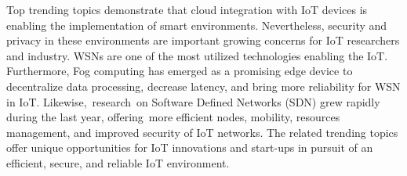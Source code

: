 \documentclass[symmetry,article,accept,moreauthors,pdftex10pt,a4paper]{mdpi}
\begin{document}
Top trending topics demonstrate that cloud integration with IoT devices is enabling the implementation of smart environments. Nevertheless, security and privacy in these environments are important growing concerns for IoT researchers and industry. WSNs are one of the most utilized technologies enabling the IoT. Furthermore, Fog computing has emerged as a promising edge device to decentralize data processing, decrease latency, and bring more reliability for WSN in IoT. Likewise,~research~on Software Defined Networks (SDN) grew rapidly during the last year, offering~more efficient nodes, mobility, resources management, and improved security of IoT networks. The related trending topics offer unique opportunities for IoT innovations and start-ups in pursuit of an efficient, secure, and reliable IoT environment. 

\vspace{6pt}





\end{document}
